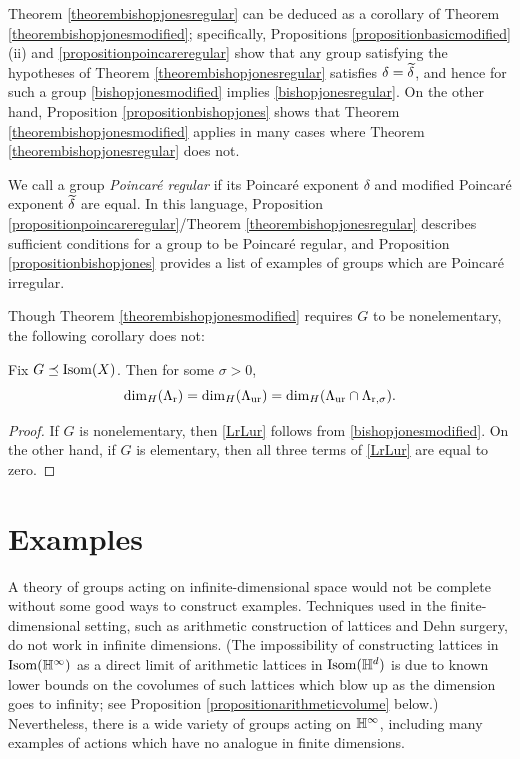 Theorem \ref{theorembishopjonesregular} can be deduced as a corollary of Theorem \ref{theorembishopjonesmodified}; specifically, Propositions \ref{propositionbasicmodified}(ii) and \ref{propositionpoincareregular} show that any group satisfying the hypotheses of Theorem \ref{theorembishopjonesregular} satisfies $\delta = \widetilde\delta$, and hence for such a group \eqref{bishopjonesmodified} implies \eqref{bishopjonesregular}. On the other hand, Proposition \ref{propositionbishopjones} shows that Theorem \ref{theorembishopjonesmodified} applies in many cases where Theorem \ref{theorembishopjonesregular} does not.

We call a group \emph{Poincar\'e regular} if its Poincar\'e exponent $\delta$ and modified Poincar\'e exponent $\widetilde\delta$ are equal. In this language, Proposition \ref{propositionpoincareregular}/Theorem \ref{theorembishopjonesregular} describes sufficient conditions for a group to be Poincar\'e regular, and Proposition \ref{propositionbishopjones} provides a list of examples of groups which are Poincar\'e irregular.

Though Theorem \ref{theorembishopjonesmodified} requires $G$ to be nonelementary, the following corollary does not:

\begin{corollary}
\label{corollaryLrLur}
Fix $G\preceq\operatorname{Isom}(X)$. Then for some $\sigma > 0$,
\begin{equation}
\label{LrLur}
{\dim_H}(\Lambda_{\mathrm r}) = {\dim_H}(\Lambda_{\mathrm{ur}}) = {\dim_H}(\Lambda_{\mathrm{ur}}\cap\Lambda_{\mathrm r,\sigma}).
\end{equation}
\end{corollary}
\begin{proof}
If $G$ is nonelementary, then \eqref{LrLur} follows from \eqref{bishopjonesmodified}. On the other hand, if $G$ is elementary, then all three terms of \eqref{LrLur} are equal to zero.
\end{proof}



\bigskip
\section{Examples}
\label{subsectionexamples}

A theory of groups acting on infinite-dimensional space would not be complete without some good ways to construct examples. Techniques used in the finite-dimensional setting, such as arithmetic construction of lattices and Dehn surgery, do not work in infinite dimensions. (The impossibility of constructing lattices in $\Isom(\H^\infty)$ as a direct limit of arithmetic lattices in $\Isom(\H^d)$ is due to known lower bounds on the covolumes of such lattices which blow up as the dimension goes to infinity; see Proposition \ref{propositionarithmeticvolume} below.) Nevertheless, there is a wide variety of groups acting on $\H^\infty$, including many examples of actions which have no analogue in finite dimensions.


